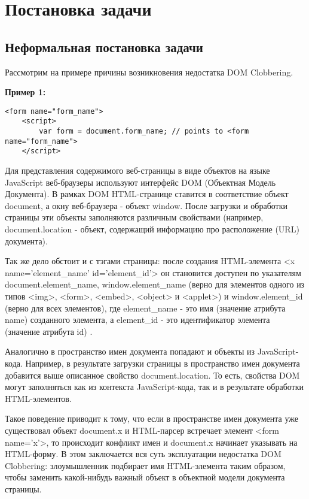 
\chapter{Постановка задачи}\label{Introduction}

\section{Неформальная постановка задачи}

Рассмотрим на примере причины возникновения недостатка DOM Clobbering.

\bigskip
\textbf{Пример 1:}
\begin{lstlisting}[caption=пример недостатка DOM Clobbering]
	<form name="form_name">
	<script>
		var form = document.form_name; // points to <form name="form_name">
	</script>
\end{lstlisting}
\bigskip




Для представления содержимого веб-страницы в виде объектов на языке Java\-Script веб-браузеры используют интерфейс DOM (Объектная Модель Документа). В рамках DOM HTML-странице ставится в соответствие объект document, а окну веб-браузера - объект window. После загрузки и обработки страницы эти объекты заполняются различным свойствами (например, document.location - объект, содержащий информацию про расположение (URL) документа).


Так же дело обстоит и с тэгами страницы: после создания HTML-элемента <x name='element\_name' id='element\_id'> он становится доступен по указателям document.element\_name, window.element\_name (верно для элементов одного из типов <img>, <form>, <embed>, <object> и <applet>) и window.element\_id (верно для всех элементов), где element\_name - это имя (значение атрибута name) созданного элемента, а element\_id - это идентификатор элемента (значение атрибута id) \cite{TWClobbering}.



Аналогично в пространство имен документа попадают и объекты из JavaScript-кода. Например, в результате загрузки страницы в пространство имен документа добавится выше описанное свойство document.location. То есть, свойства DOM могут заполняться как из контекста JavaScript-кода, так и в результате обработки HTML-элементов.


Такое поведение приводит к тому, что если в пространстве имен документа уже существовал объект document.x и HTML-парсер встречает элемент <form name='x'>, то происходит конфликт имен и document.x начинает указывать на \\HTML-форму. В этом заключается вся суть эксплуатации недостатка DOM Clobber\-ing: злоумышленник подбирает имя HTML-элемента таким образом, чтобы заменить какой-нибудь важный объект в объектной модели документа страницы.


